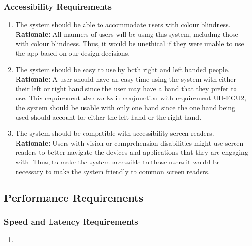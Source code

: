 \documentclass[]{article}
\begin{document}
\subsubsection{Accessibility Requirements}
\label{ssub:accessibility_requirements}
\begin{enumerate}[label={UH-A\arabic*.}]
	\item The system should be able to accommodate users with colour blindness.\\
	\textbf{Rationale:} All manners of users will be using this system, including those with colour blindness. Thus, it would be unethical if they were unable to use the app based on our design decisions.
	\item The system should be easy to use by both right and left handed people.\\
	\textbf{Rationale:} A user should have an easy time using the system with either their left or right hand since the user may have a hand that they prefer to use. This requirement also works in conjunction with requirement UH-EOU2, the system should be usable with only one hand since the one hand being used should account for either the left hand or the right hand.
	\item The system should be compatible with accessibility screen readers.\\
	\textbf{Rationale:} Users with vision or comprehension disabilities might use screen readers to better navigate the devices and applications that they are engaging with. Thus, to make the system accessible to those users it would be necessary to make the system friendly to common screen readers.
\end{enumerate}


\subsection{Performance Requirements}
\label{sub:performance_requirements}

\subsubsection{Speed and Latency Requirements}
\label{ssub:speed_and_latency_requirements}
\begin{enumerate}[label={PR-SL\arabic*.}]
    \item 
\end{enumerate}
\end{document}
